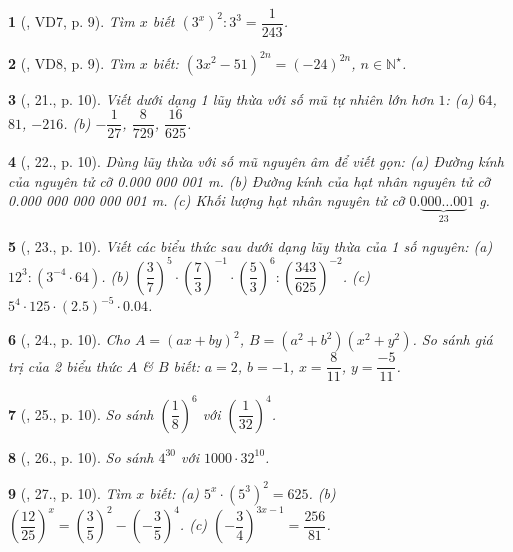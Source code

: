 \documentclass{article}
\newtheorem{baitoan}{}
\begin{document}
\begin{baitoan}[\cite{Tuyen_Toan_7}, VD7, p. 9]
	Tìm $x$ biết $(3^x)^2:3^3 = \dfrac{1}{243}$.
\end{baitoan}

\begin{baitoan}[\cite{Tuyen_Toan_7}, VD8, p. 9]
	Tìm $x$ biết: $(3x^2 - 51)^{2n} = (-24)^{2n}$, $n\in\mathbb{N}^\star$.
\end{baitoan}

\begin{baitoan}[\cite{Tuyen_Toan_7}, 21., p. 10]
	Viết dưới dạng 1 lũy thừa với số mũ tự nhiên lớn hơn $1$: (a) $64$, $81$, $-216$. (b) $-\dfrac{1}{27}$, $\dfrac{8}{729}$, $\dfrac{16}{625}$.
\end{baitoan}

\begin{baitoan}[\cite{Tuyen_Toan_7}, 22., p. 10]
	Dùng lũy thừa với số mũ nguyên âm để viết gọn: (a) Đường kính của nguyên tử cỡ {\rm0.000 000 001 m}. (b) Đường kính của hạt nhân nguyên tử cỡ {\rm0.000 000 000 000 001 m}. (c) Khối lượng hạt nhân nguyên tử cỡ $0.\underbrace{000\ldots 00}_{23}1$ {\rm g}.
\end{baitoan}

\begin{baitoan}[\cite{Tuyen_Toan_7}, 23., p. 10]
	Viết các biểu thức sau dưới dạng lũy thừa của 1 số nguyên: (a) $12^3:(3^{-4}\cdot 64)$. (b) $\left(\dfrac{3}{7}\right)^5\cdot\left(\dfrac{7}{3}\right)^{-1}\cdot\left(\dfrac{5}{3}\right)^6:\left(\dfrac{343}{625}\right)^{-2}$. (c) $5^4\cdot 125\cdot(2.5)^{-5}\cdot 0.04$.
\end{baitoan}

\begin{baitoan}[\cite{Tuyen_Toan_7}, 24., p. 10]
	Cho $A = (ax + by)^2$, $B = (a^2 + b^2)(x^2 + y^2)$. So sánh giá trị của 2 biểu thức $A$ \& $B$ biết: $a = 2$, $b = -1$, $x = \dfrac{8}{11}$, $y = \dfrac{-5}{11}$.
\end{baitoan}

\begin{baitoan}[\cite{Tuyen_Toan_7}, 25., p. 10]
	So sánh $\left(\dfrac{1}{8}\right)^6$ với $\left(\dfrac{1}{32}\right)^4$.
\end{baitoan}

\begin{baitoan}[\cite{Tuyen_Toan_7}, 26., p. 10]
	So sánh $4^{30}$ với $1000\cdot 32^{10}$.
\end{baitoan}

\begin{baitoan}[\cite{Tuyen_Toan_7}, 27., p. 10]
	Tìm $x$ biết: (a) $5^x\cdot(5^3)^2 = 625$. (b) $\left(\dfrac{12}{25}\right)^x = \left(\dfrac{3}{5}\right)^2 - \left(-\dfrac{3}{5}\right)^4$. (c) $\left(-\dfrac{3}{4}\right)^{3x - 1} = \dfrac{256}{81}$.
\end{baitoan}
\end{document}
